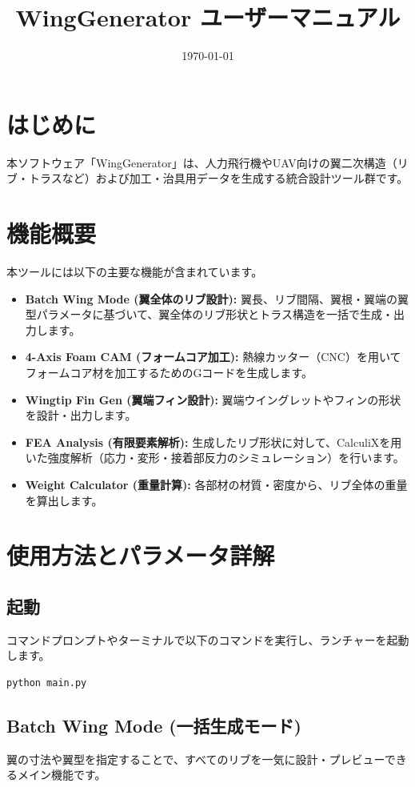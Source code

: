 \documentclass[11pt,a4paper]{ltjsarticle}
\title{WingGenerator ユーザーマニュアル}
\author{}
\date{\today}
\begin{document}
\maketitle

\tableofcontents
\newpage

\section{はじめに}
本ソフトウェア「WingGenerator」は、人力飛行機やUAV向けの翼二次構造（リブ・トラスなど）および加工・治具用データを生成する統合設計ツール群です。

\section{機能概要}
本ツールには以下の主要な機能が含まれています。
\begin{itemize}
    \item \textbf{Batch Wing Mode (翼全体のリブ設計):} 翼長、リブ間隔、翼根・翼端の翼型パラメータに基づいて、翼全体のリブ形状とトラス構造を一括で生成・出力します。
    \item \textbf{4-Axis Foam CAM (フォームコア加工):} 熱線カッター（CNC）を用いてフォームコア材を加工するためのGコードを生成します。
    \item \textbf{Wingtip Fin Gen (翼端フィン設計):} 翼端ウイングレットやフィンの形状を設計・出力します。
    \item \textbf{FEA Analysis (有限要素解析):} 生成したリブ形状に対して、CalculiXを用いた強度解析（応力・変形・接着部反力のシミュレーション）を行います。
    \item \textbf{Weight Calculator (重量計算):} 各部材の材質・密度から、リブ全体の重量を算出します。
\end{itemize}

\section{使用方法とパラメータ詳解}

\subsection{起動}
コマンドプロンプトやターミナルで以下のコマンドを実行し、ランチャーを起動します。
\begin{lstlisting}[language=bash, frame=single]
python main.py
\end{lstlisting}

\subsection{Batch Wing Mode (一括生成モード)}
翼の寸法や翼型を指定することで、すべてのリブを一気に設計・プレビューできるメイン機能です。
\end{document}
